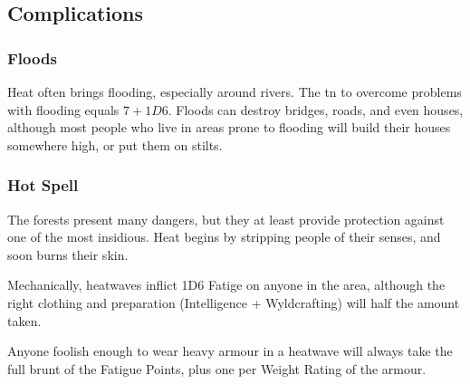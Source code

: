 \begin{multicols}{2}
\begin{boxtable}[cccL]
\end{boxtable}

\subsection{Complications}

\subsubsection{Floods}

Heat often brings flooding, especially around rivers.
The \gls{tn} to overcome problems with flooding equals $7 + 1D6$.
Floods can destroy bridges, roads, and even houses, although most people who live in areas prone to flooding will build their houses somewhere high, or put them on stilts.

\subsubsection{Hot Spell}

The forests present many dangers, but they at least provide protection against one of the most insidious.
Heat begins by stripping people of their senses, and soon burns their skin.

Mechanically, heatwaves inflict 1D6 Fatige on anyone in the area, although the right clothing and preparation (Intelligence + Wyldcrafting) will half the amount taken.

Anyone foolish enough to wear heavy armour in a heatwave will always take the full brunt of the Fatigue Points, plus one per Weight Rating of the armour.


\end{multicols}
